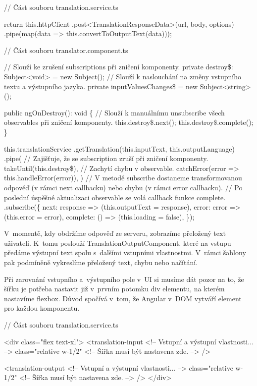 \begin{prog}
// Část souboru translation.service.ts

return this.httpClient
  .post<TranslationResponseData>(url, body, options)
  .pipe(map(data => this.convertToOutputText(data)));

// Část souboru translator.component.ts

// Slouží ke zrušení subscriptions při zničení komponenty.
private destroy\$: Subject<void> = new Subject();
// Slouží k naslouchání na změny vstupního textu a výstupního jazyka.
private inputValuesChanges\$ = new Subject<string>();

public ngOnDestroy(): void \{
  // Slouží k manuálnímu unsubscribe všech observables při zničení komponenty.
  this.destroy\$.next();
  this.destroy\$.complete();
\}

this.translationService
  .getTranslation(this.inputText, this.outputLanguage)
  .pipe(
    // Zajišťuje, že se subscription zruší při zničení komponenty.
    takeUntil(this.destroy\$),
    // Zachytí chybu v observable.
    catchError(error => this.handleError(error)),
  )
  // V metodě subscribe dostaneme transformovanou odpověď 
    (v rámci next callbacku) nebo chybu (v rámci error callbacku).
  // Po poslední úspěšné aktualizaci observable se volá callback funkce complete.
  .subscribe(\{
    next: response => (this.outputText = response),
    error: error => (this.error = error),
    complete: () => (this.loading = false),
  \});
\end{prog}

V~momentě, kdy obdržíme odpověď ze serveru, zobrazíme přeložený text uživateli. 
K~tomu poslouží TranslationOutputComponent, které na vstupu předáme výstupní text spolu s~dalšími vstupními vlastnostmi. 
V~rámci šablony pak podmíněně vykreslíme přeložený text, chybu nebo načítání. 

Při zarovnání vstupního a~výstupního pole v~UI si musíme dát pozor na to, že šířku je potřeba nastavit již v~prvním potomku div elementu, na kterém nastavíme flexbox. 
Důvod spočívá v~tom, že Angular v~DOM vytváří element pro každou komponentu.

\newpage
\begin{prog}
// Část souboru translation.service.ts

<div class="flex text-xl">
  <translation-input 
    <!-- Vstupní a výstupní vlastnosti... -->
    class="relative w-1/2"
    <!-- Šířka musí být nastavena zde. -->
  />

  <translation-output 
    <!-- Vstupní a výstupní vlastnosti... -->
    class="relative w-1/2"
    <!-- Šířka musí být nastavena zde. -->
  />
</div>
\end{prog}

